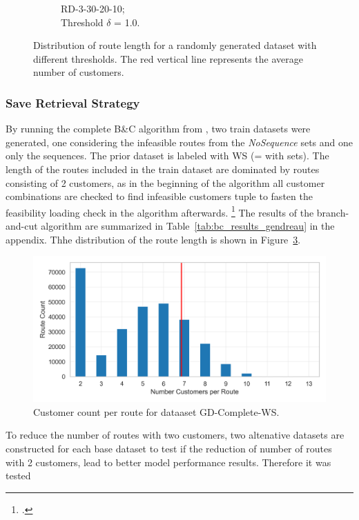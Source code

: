 \begin{figure}[!h]
\begin{subfigure}[t]{.33\textwidth}
        \caption{RD-3-30-20-10; \\ Threshold $\delta$ = 1.0.}
        \label{fig:ds-c}
    \end{subfigure}
    \caption{Distribution of route length for a randomly generated dataset with different thresholds.
        The red vertical line represents the average number of customers.}
    \label{fig:route-dists_randomdata}
\end{figure}



\subsubsection{Save Retrieval Strategy}

By running the complete B\&C algorithm from \cite{tamke_branch-and-cut_2024}, two train datasets were generated,
one considering the infeasible routes from the \textit{NoSequence} sets and one only the sequences. The prior dataset is
labeled with WS (= with sets). The length of the routes included in the
train dataset are dominated by routes consisting of 2 customers,
as in the beginning of the algorithm all customer combinations are checked to find infeasible customers tuple to
fasten the feasibility loading check in the algorithm afterwards. \footcite[cf.][]{tamke_branch-and-cut_2024}
The results of the branch-and-cut algorithm are summarized in Table~\ref{tab:bc_results_gendreau} in the appendix.
Thhe distribution of the route length is shown in Figure~\ref{fig:customer_count_bc}.
\begin{figure}
    \begin{center}
        \includegraphics[width = .5\textwidth]{pictures/dataset_structure/no_cust_plot_gendreau_28880_600_WS.png}
        \caption{Customer count per route for dataaset GD-Complete-WS.}
        \label{fig:customer_count_bc}
    \end{center}
\end{figure}
To reduce the number of routes with two customers, two altenative datasets are constructed for each base dataset to test if the reduction
of number of routes with 2 customers, lead to better model performance results. Therefore it was tested
